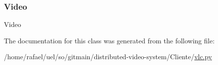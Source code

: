 \subsubsection{\texorpdfstring{Video}{Video}}
{\footnotesize\ttfamily Video\hspace{0.3cm}{\ttfamily [static]}}



The documentation for this class was generated from the following file\+:\begin{DoxyCompactItemize}
\item 
/home/rafael/uel/so/gitmain/distributed-\/video-\/system/\+Cliente/\hyperlink{vlc_8py}{vlc.\+py}\end{DoxyCompactItemize}

